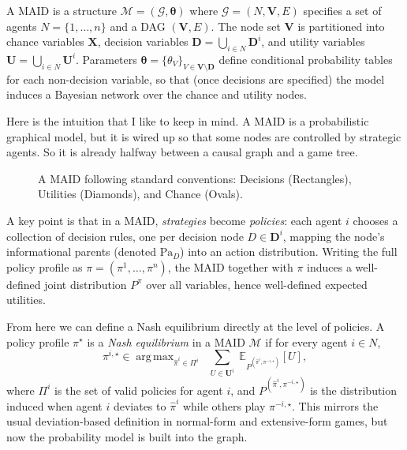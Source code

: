 \documentclass{article}
\DeclareMathOperator*{\argmax}{arg\,max}
\begin{document}
A MAID is a structure $\mathcal{M} = (\mathcal{G}, \boldsymbol{\theta})$ where $\mathcal{G} = (N, \mathbf{V}, E)$ specifies a set of agents $N=\{1,\dots,n\}$ and a DAG $(\mathbf{V}, E)$. The node set $\mathbf{V}$ is partitioned into chance variables $\mathbf{X}$, decision variables $\mathbf{D}=\bigcup_{i\in N}\mathbf{D}^i$, and utility variables $\mathbf{U}=\bigcup_{i\in N}\mathbf{U}^i$. Parameters $\boldsymbol{\theta}=\{\theta_V\}_{V\in\mathbf{V}\setminus \mathbf{D}}$ define conditional probability tables for each non-decision variable, so that (once decisions are specified) the model induces a Bayesian network over the chance and utility nodes.

Here is the intuition that I like to keep in mind. A MAID is a probabilistic graphical model, but it is wired up so that some nodes are controlled by strategic agents. So it is already halfway between a causal graph and a game tree.


\begin{figure}[htbp]
\centering
{}
\caption{A MAID following standard conventions: Decisions (Rectangles), Utilities (Diamonds), and Chance (Ovals).}
\label{fig:maid-example}
\end{figure}

A key point is that in a MAID, \emph{strategies} become \emph{policies}: each agent $i$ chooses a collection of decision rules, one per decision node $D\in \mathbf{D}^i$, mapping the node's informational parents (denoted $\mathrm{Pa}_D$) into an action distribution. Writing the full policy profile as $\pi=(\pi^1,\dots,\pi^n)$, the MAID together with $\pi$ induces a well-defined joint distribution $P^\pi$ over all variables, hence well-defined expected utilities.

From here we can define a Nash equilibrium directly at the level of policies. A policy profile $\pi^\star$ is a \emph{Nash equilibrium} in a MAID $\mathcal{M}$ if for every agent $i\in N$,
\[
\pi^{i,\star} \in \argmax_{\hat{\pi}^i \in \Pi^i}
\;\;\sum_{U\in\mathbf{U}^i}\; \mathbb{E}_{P^{(\hat{\pi}^i,\pi^{-i,\star})}}[U],
\]
where $\Pi^i$ is the set of valid policies for agent $i$, and $P^{(\hat{\pi}^i,\pi^{-i,\star})}$ is the distribution induced when agent $i$ deviates to $\hat{\pi}^i$ while others play $\pi^{-i,\star}$. This mirrors the usual deviation-based definition in normal-form and extensive-form games, but now the probability model is built into the graph.
\end{document}
